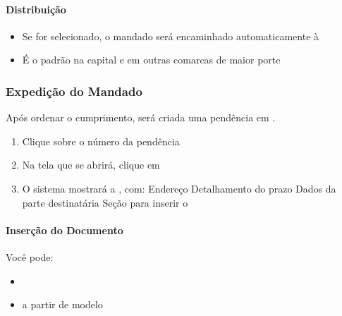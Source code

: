 \documentclass[letterpaper,10pt,brazil]{sphinxmanual}
\begin{document}
\paragraph{Distribuição}
\label{\detokenize{projud_32_expedicaomandado:distribuicao}}\begin{itemize}
\item {} 
\sphinxAtStartPar
Se  for selecionado, o mandado será encaminhado automaticamente à 

\item {} 
\sphinxAtStartPar
É o padrão na capital e em outras comarcas de maior porte

\end{itemize}


\subsubsection{Expedição do Mandado}
\label{\detokenize{projud_32_expedicaomandado:expedicao-do-mandado}}
\sphinxAtStartPar
Após ordenar o cumprimento, será criada uma pendência em .
\begin{enumerate}
%
\item {} 
\sphinxAtStartPar
Clique sobre o número da pendência

\item {} 
\sphinxAtStartPar
Na tela que se abrirá, clique em 

\item {} 
\sphinxAtStartPar
O sistema mostrará a , com:
\sphinxhyphen{} Endereço
\sphinxhyphen{} Detalhamento do prazo
\sphinxhyphen{} Dados da parte destinatária
\sphinxhyphen{} Seção para inserir o 

\end{enumerate}


\paragraph{Inserção do Documento}
\label{\detokenize{projud_32_expedicaomandado:insercao-do-documento}}
\sphinxAtStartPar
Você pode:
\begin{itemize}
\item {} 
\sphinxAtStartPar
{}

\item {} 
\sphinxAtStartPar
{} a partir de modelo

\end{itemize}
\end{document}
